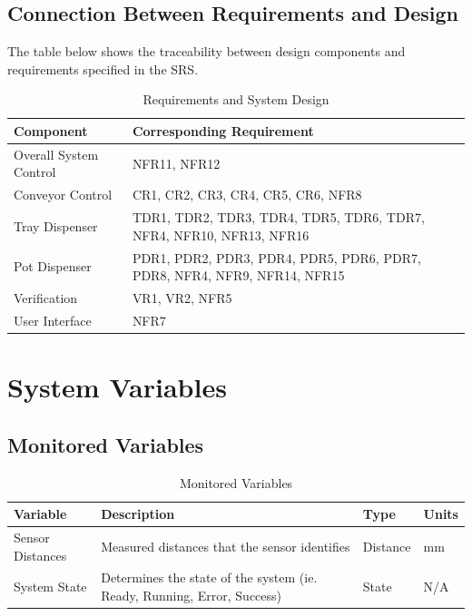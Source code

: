 \documentclass[12pt, titlepage]{article}
\begin{document}
\subsection{Connection Between Requirements and Design} \label{SecConnection}

  The table below shows the traceability between design components and requirements specified in the SRS.
  
\begin{table}[H]
\caption{Requirements and System Design}
\begin{tabularx}{\textwidth}{|l|X|}
\hline
\textbf{Component} & \textbf{Corresponding Requirement} \\ \hline
Overall System Control  & NFR11, NFR12 \\ \hline
Conveyor Control   & CR1, CR2, CR3, CR4, CR5, CR6, NFR8 \\ \hline
Tray Dispenser   & TDR1, TDR2, TDR3, TDR4, TDR5, TDR6, TDR7, NFR4, NFR10, NFR13, NFR16 \\ \hline
Pot Dispenser   &  PDR1, PDR2, PDR3, PDR4, PDR5, PDR6, PDR7, PDR8, NFR4, NFR9, NFR14, NFR15  \\ \hline
Verification   &  VR1, VR2, NFR5 \\ \hline
User Interface  &  NFR7 \\ \hline
\end{tabularx}
\end{table}

\section{System Variables}


\subsection{Monitored Variables}
\begin{table}[H]
\caption{Monitored Variables}
\begin{tabular}{ |p{3cm}|p{9cm}|p{2cm}|p{1cm}| }
  \hline
  Variable & Description & Type & Units\\
  \hline
  Sensor Distances & Measured distances that the sensor identifies
   & Distance & mm\\
  \hline
  System State & Determines the state of the system (ie. Ready, Running, Error, Success)
   & State &  N/A\\
  \hline
 \end{tabular}\\\\
 \end{table}
\end{document}
